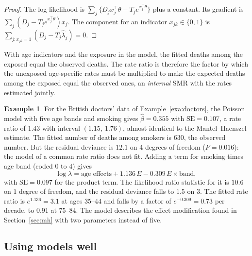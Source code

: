 \documentclass[11pt,a4paper]{article}
\numberwithin{equation}{section}
\theoremstyle{definition}
\newtheorem{exa}[thm]{Example}
\begin{document}
\begin{proof}
The log-likelihood is $\sum_j \{D_j x_j^\top\theta - T_j e^{x_j^\top\theta}\}$ plus a constant. Its gradient is $\sum_j (D_j - T_j e^{x_j^\top\theta})x_j$. The component for an indicator $x_{jk} \in \{0, 1\}$ is
$\sum_{j: x_{jk} = 1}(D_j - T_j\hat\lambda_j) = 0$.
\end{proof}

With age indicators and the exposure in the model, the fitted deaths among the exposed equal the observed deaths. The rate ratio is
therefore the factor by which the unexposed age-specific rates must be multiplied to make the expected deaths among the exposed equal the
observed ones, an \emph{internal} SMR with the rates estimated jointly.

\begin{exa}
\label{exa:poisson}
For the British doctors' data of Example~\ref{exa:doctors}, the Poisson model with five age bands and smoking gives $\hat\beta = 0.355$ with
$\text{SE} = 0.107$, a rate ratio of $1.43$ with interval $(1.15,\ 1.76)$, almost identical to the Mantel--Haenszel estimate. The fitted number of deaths among
smokers is $630$, the observed number. But the residual deviance is $12.1$ on $4$ degrees of freedom ($P = 0.016$): the model of a common rate
ratio does not fit. Adding a term for smoking times age band (coded $0$ to $4$) gives
\[
\log\lambda = \text{age effects} + 1.136\,E - 0.309\,E \times \text{band} ,
\]
with $\text{SE} = 0.097$ for the product term. The likelihood ratio statistic for it is $10.6$ on $1$ degree of freedom, and the residual deviance falls to $1.5$
on $3$. The fitted rate ratio is $e^{1.136} = 3.1$ at ages $35$--$44$ and falls by a factor of $e^{-0.309} = 0.73$ per decade, to $0.91$ at $75$--$84$. The model describes
the effect modification found in Section~\ref{sec:mh} with two parameters instead of five.
\end{exa}

\subsection{Using models well}
\end{document}
